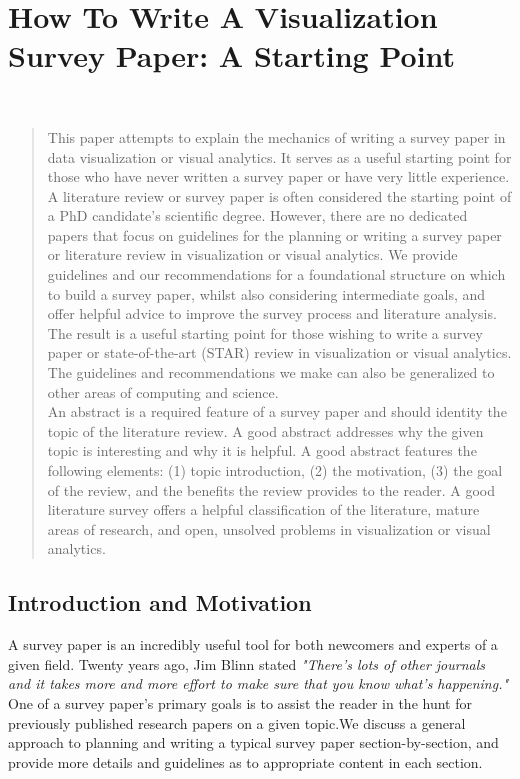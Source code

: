 \chapter{How To Write A Visualization Survey Paper: A Starting Point}
\label{chap:howTo}
 \cite{mcnabb2019how} \\

\begin{abstract}
This paper attempts to explain the mechanics of writing a survey paper in data visualization or visual analytics. It serves as a useful starting point for those who have never written a survey paper or have very little experience. A literature review or survey paper is often considered the starting point of a PhD candidate's scientific degree. However, there are no dedicated papers that focus on guidelines for the planning or writing a survey paper or literature review in visualization or visual analytics. We provide guidelines and our recommendations for a foundational structure on which to build a survey paper, whilst also considering intermediate goals, and offer helpful advice to improve the  survey process and literature analysis. The result is a useful starting point for those wishing to write a survey paper or state-of-the-art (STAR) review in visualization or visual analytics. The guidelines and recommendations we make can also be generalized to other areas of computing and science.\\

An abstract is a required feature of a survey paper and should identity the topic of the literature review. A good abstract addresses why the given topic is interesting and why it is helpful. A good abstract features the following elements:  (1) topic introduction, (2) the motivation, (3) the goal of the review, and the benefits the review provides to the reader. A good literature survey offers a helpful classification of the literature, mature areas of research, and open, unsolved  problems in visualization or visual analytics.
\end{abstract}  \newpage
\section{Introduction and Motivation} \label{sec:introduction}
A survey paper is an incredibly useful tool for both newcomers and experts of a given field. Twenty years ago, Jim Blinn stated \emph{"There's lots of other journals and it takes more and more effort to make sure that you know what's happening."} \cite{blinn1998ten} One of a survey paper's primary goals is to assist the reader in the hunt for  previously published research papers on a given topic.We discuss a general approach to planning and writing a typical survey paper section-by-section, and provide  more details and guidelines as to appropriate content in each section. 


